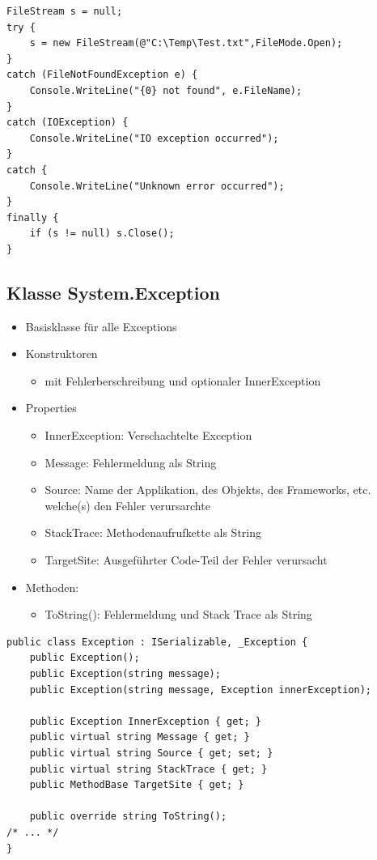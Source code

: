 \begin{lstlisting}
FileStream s = null;
try {
    s = new FileStream(@"C:\Temp\Test.txt",FileMode.Open);
}
catch (FileNotFoundException e) {
    Console.WriteLine("{0} not found", e.FileName);
}
catch (IOException) {
    Console.WriteLine("IO exception occurred");
}
catch {
    Console.WriteLine("Unknown error occurred");
}
finally {
    if (s != null) s.Close();
}
\end{lstlisting}

\subsection{Klasse System.Exception}
\begin{itemize}
    \item Basisklasse für alle Exceptions
    \item Konstruktoren
    \begin{itemize}
        \item mit Fehlerberschreibung und optionaler InnerException
    \end{itemize}
    \item Properties
    \begin{itemize}
        \item InnerException: Verschachtelte Exception
        \item Message: Fehlermeldung als String
        \item Source: Name der Applikation, des Objekts, des Frameworks, etc. welche(s) den Fehler verursarchte
        \item StackTrace: Methodenaufrufkette als String
        \item TargetSite: Ausgeführter Code-Teil der Fehler verursacht
    \end{itemize}
    \item Methoden:
    \begin{itemize}
        \item ToString(): Fehlermeldung und Stack Trace als String
    \end{itemize}
\end{itemize}
\begin{lstlisting}
public class Exception : ISerializable, _Exception {
    public Exception();
    public Exception(string message);
    public Exception(string message, Exception innerException);

    public Exception InnerException { get; }
    public virtual string Message { get; }
    public virtual string Source { get; set; }
    public virtual string StackTrace { get; }
    public MethodBase TargetSite { get; }

    public override string ToString();
/* ... */
}
\end{lstlisting}

